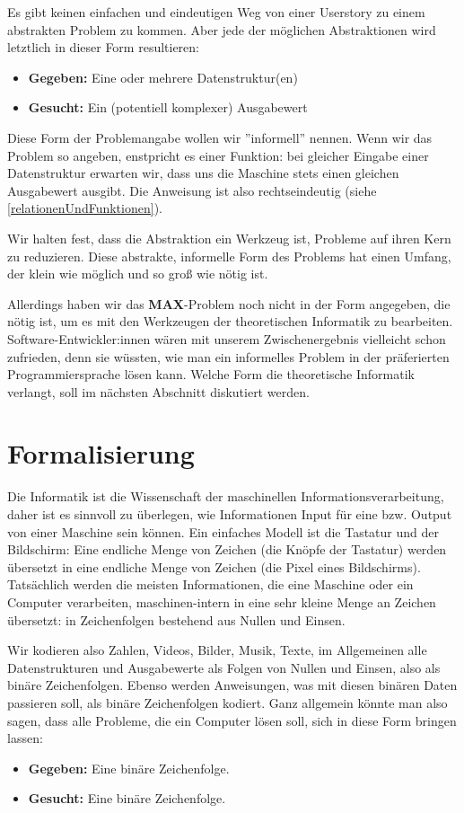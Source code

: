 Es gibt keinen einfachen und eindeutigen Weg von einer Userstory
zu einem abstrakten Problem zu kommen.
Aber jede der möglichen Abstraktionen wird letztlich in dieser Form resultieren:
\begin{itemize}
    \item \textbf{Gegeben:} Eine oder mehrere Datenstruktur(en)
    \item \textbf{Gesucht:} Ein (potentiell komplexer) Ausgabewert
\end{itemize}
Diese Form der Problemangabe wollen wir ''informell'' nennen.
Wenn wir das Problem so angeben, enstpricht es einer Funktion:
bei gleicher Eingabe einer Datenstruktur
erwarten wir, dass uns die Maschine stets einen
gleichen Ausgabewert ausgibt.
Die Anweisung ist also rechtseindeutig (siehe \autoref{relationenUndFunktionen}).

Wir halten fest, dass die Abstraktion ein Werkzeug ist,
Probleme auf ihren Kern zu reduzieren.
Diese abstrakte, informelle Form des Problems hat einen Umfang,
der klein wie möglich und so groß wie nötig ist.

Allerdings haben wir das \textbf{MAX}-Problem noch nicht in der Form angegeben,
die nötig ist, um es mit den Werkzeugen der theoretischen Informatik zu bearbeiten.
Software-Entwickler:innen wären mit unserem Zwischenergebnis vielleicht schon zufrieden,
denn sie wüssten, wie man ein informelles Problem
in der präferierten Programmiersprache lösen kann.
Welche Form die theoretische Informatik verlangt, soll im nächsten Abschnitt diskutiert werden.

\section{Formalisierung}

Die Informatik ist die Wissenschaft der maschinellen Informationsverarbeitung,
daher ist es sinnvoll zu überlegen,
wie Informationen Input für eine bzw. Output von einer Maschine sein können.
Ein einfaches Modell ist die Tastatur und der Bildschirm:
Eine endliche Menge von Zeichen (die Knöpfe der Tastatur) werden übersetzt in eine
endliche Menge von Zeichen (die Pixel eines Bildschirms).
Tatsächlich werden die meisten Informationen,
die eine Maschine oder ein Computer verarbeiten,
maschinen-intern in eine sehr kleine Menge an Zeichen übersetzt:
in Zeichenfolgen bestehend aus Nullen und Einsen.

Wir kodieren also Zahlen, Videos, Bilder, Musik, Texte, im Allgemeinen alle Datenstrukturen
und Ausgabewerte als Folgen von Nullen und Einsen,
also als binäre Zeichenfolgen.
Ebenso werden Anweisungen, was mit diesen binären Daten passieren soll,
als binäre Zeichenfolgen kodiert.
Ganz allgemein könnte man also sagen, dass alle Probleme, die ein Computer lösen soll,
sich in diese Form bringen lassen:
\begin{itemize}
    \item \textbf{Gegeben:} Eine binäre Zeichenfolge.
    \item \textbf{Gesucht:} Eine binäre Zeichenfolge.
\end{itemize}


